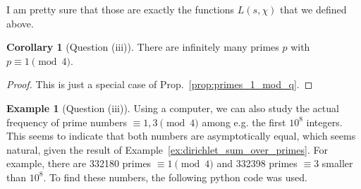 \documentclass{scrartcl}
\theoremstyle{definition}
\newtheorem{example}[definition]{Example}
\newtheorem{corollary}[definition]{Corollary}
\begin{document}
I am pretty sure that those are exactly the functions $L(s, \chi)$ that we defined above.
\begin{corollary}[Question (iii)]
    There are infinitely many primes $p$ with $p \equiv 1 \pmod 4$.
\end{corollary}
\begin{proof}
    This is just a special case of Prop.~\ref{prop:primes_1_mod_q}.
\end{proof}
\begin{example}[Question (iii)]
    Using a computer, we can also study the actual frequency of prime numbers $\equiv 1, 3 \pmod 4$ among e.g. the first $10^8$ integers.
    This seems to indicate that both numbers are asymptotically equal, which seems natural, given the result of Example~\ref{ex:dirichlet_sum_over_primes}.
    For example, there are 332180 primes $\equiv 1 \pmod 4$ and 332398 primes $\equiv 3$ smaller than $10^8$.
    To find these numbers, the following python code was used.
    
\end{example}
\end{document}
